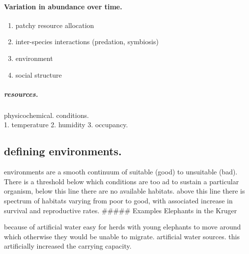 \documentclass[]{article}
\providecommand{\tightlist}{%
  \setlength{\itemsep}{0pt}\setlength{\parskip}{0pt}}
\let\oldparagraph\paragraph
\renewcommand{\paragraph}[1]{\oldparagraph{#1}\mbox{}}
\let\oldsubparagraph\subparagraph
\renewcommand{\subparagraph}[1]{\oldsubparagraph{#1}\mbox{}}
\begin{document}
\hypertarget{variation-in-abundance-over-time.}{%
\paragraph{Variation in abundance over
time.}\label{variation-in-abundance-over-time.}}

\begin{enumerate}
\def\labelenumi{\arabic{enumi}.}
\tightlist
\item
  patchy resource allocation
\item
  inter-species interactions (predation, symbiosis)
\item
  environment
\item
  social structure
\end{enumerate}

\hypertarget{resources.}{%
\subparagraph{resources.}\label{resources.}}

physicochemical. conditions.\\
1. temperature 2. humidity 3. occupancy.

\hypertarget{defining-environments.}{%
\subsection{defining environments.}\label{defining-environments.}}

environments are a smooth continuum of suitable (good) to unsuitable
(bad). There is a threshold below which conditions are too ad to sustain
a particular organism, below this line there are no available habitats.
above this line there is spectrum of habitats varying from poor to good,
with associated increase in survival and reproductive rates. \#\#\#\#\#
Examples Elephants in the Kruger

because of artificial water easy for herds with young elephants to move
around which otherwise they would be unable to migrate. artificial water
sources. this artificially increased the carrying capacity.
\end{document}
